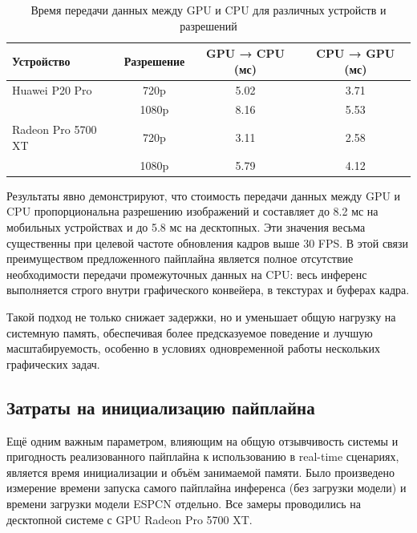 \documentclass[a4paper,14pt]{extreport}
\begin{document}
            \begin{table}[h!]
                \centering
                \caption{Время передачи данных между GPU и CPU для различных устройств и разрешений}
                \vspace*{10pt}
                \begin{tabular}{|l|c|c|c|}
                    \hline
                    Устройство & Разрешение & GPU → CPU (мс) & CPU → GPU (мс) \\
                    \hline
                    Huawei P20 Pro     & 720p  & 5.02 & 3.71 \\
                                       & 1080p & 8.16 & 5.53 \\
                    \hline
                    Radeon Pro 5700 XT & 720p  & 3.11 & 2.58 \\
                                       & 1080p & 5.79 & 4.12 \\
                    \hline
                \end{tabular}
            \end{table}

            Результаты явно демонстрируют, что стоимость передачи данных между GPU и CPU пропорциональна разрешению изображений и составляет до 8.2 мс на мобильных устройствах и до 5.8 мс на десктопных. Эти значения весьма существенны при целевой частоте обновления кадров выше 30 FPS. В этой связи преимуществом предложенного пайплайна является полное отсутствие необходимости передачи промежуточных данных на CPU: весь инференс выполняется строго внутри графического конвейера, в текстурах и буферах кадра.

            Такой подход не только снижает задержки, но и уменьшает общую нагрузку на системную память, обеспечивая более предсказуемое поведение и лучшую масштабируемость, особенно в условиях одновременной работы нескольких графических задач.

            \subsection{Затраты на инициализацию пайплайна}
            Ещё одним важным параметром, влияющим на общую отзывчивость системы и пригодность реализованного пайплайна к использованию в real-time сценариях, является время инициализации и объём занимаемой памяти. Было произведено измерение времени запуска самого пайплайна инференса (без загрузки модели) и времени загрузки модели ESPCN отдельно. Все замеры проводились на десктопной системе с GPU Radeon Pro 5700 XT.
            
\end{document}
